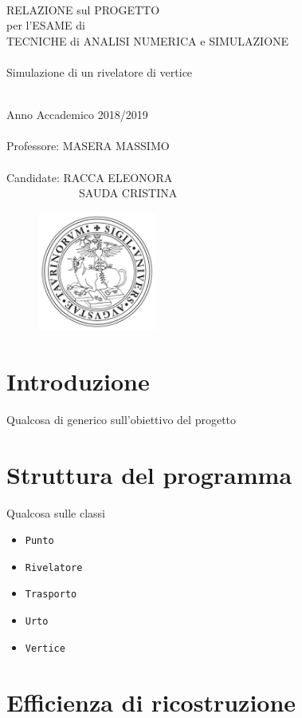 \documentclass[11pt,a4paper]{article}
\begin{document}
\thispagestyle{empty}

\rmfamily
\begin{center}
\ \\
\vspace{2cm}

\LARGE{\textcolor[rgb]{1,0,0}{RELAZIONE sul PROGETTO\\ per l'ESAME di\\TECNICHE di ANALISI NUMERICA e SIMULAZIONE}\\}
\huge{\textcolor[rgb]{1,0,0}{\ \\Simulazione di un rivelatore di vertice}\\}
\hrulefill \\
\vspace{1.5cm}

\Large{Anno Accademico 2018/2019
\\ \ \\
Professore: MASERA MASSIMO
\\ \ \\ 
Candidate: RACCA ELEONORA\\
\ \ \ \ \ \ \ \ \ \ \ \ \ SAUDA CRISTINA}

\vspace{6cm}
\begin{figure}[h]
\centering
	\includegraphics[width=0.35\textwidth]{logounito.pdf}
\end{figure}

\end{center}

\section{Introduzione}
\par Qualcosa di generico sull'obiettivo del progetto

\section{Struttura del programma}
\par Qualcosa sulle classi
\begin{itemize}
\item \lstinline{Punto}
\item \lstinline{Rivelatore}
\item \lstinline{Trasporto}
\item \lstinline{Urto}
\item \lstinline{Vertice}
\end{itemize}

\section{Efficienza di ricostruzione}
\end{document}
